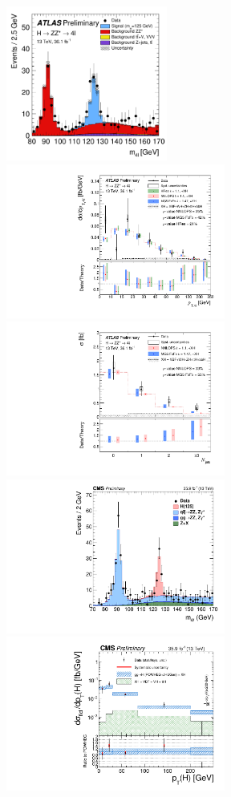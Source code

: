 \documentclass[10pt]{article}
\begin{document}
\begin{figure}[htb]
\centering
\includegraphics[height=2in]{figures/ATLAS-CONF-2017-032__fig_01__m4l.pdf}
\includegraphics[height=2in]{figures/ATLAS-CONF-2017-032__fig_08a__pT4l.pdf}
\includegraphics[height=2in]{figures/ATLAS-CONF-2017-032__fig_09a__njets.pdf}\\
\includegraphics[height=2in]{figures/CMS-HIG-16-041__Figure_003-b__m4l.pdf}
\includegraphics[height=2in]{figures/CMS-HIG-16-041__Figure_009-b__pT4l.pdf}

\end{figure}
\end{document}
